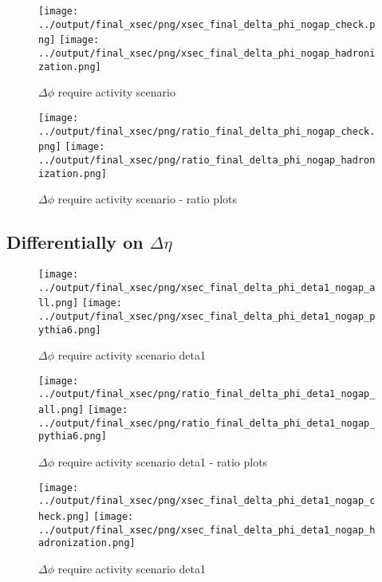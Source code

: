 \documentclass[11pt]{article}
\begin{document}
\begin{figure}[ht]
\centering
\texttt{[image: ../output/final\_xsec/png/xsec\_final\_delta\_phi\_nogap\_check.png]}
\texttt{[image: ../output/final\_xsec/png/xsec\_final\_delta\_phi\_nogap\_hadronization.png]}
\caption{$\Delta\phi$ require activity scenario}
\label{fig:delta_phi_nogapb}
\end{figure}

\begin{figure}[ht]
\centering
\texttt{[image: ../output/final\_xsec/png/ratio\_final\_delta\_phi\_nogap\_check.png]}
\texttt{[image: ../output/final\_xsec/png/ratio\_final\_delta\_phi\_nogap\_hadronization.png]}
\caption{$\Delta\phi$ require activity scenario - ratio plots}
\label{fig:delta_phi_nogapb_ratio}
\end{figure}

\clearpage
\subsection{Differentially on $\Delta\eta$}

\begin{figure}[ht]
\centering
\texttt{[image: ../output/final\_xsec/png/xsec\_final\_delta\_phi\_deta1\_nogap\_all.png]}
\texttt{[image: ../output/final\_xsec/png/xsec\_final\_delta\_phi\_deta1\_nogap\_pythia6.png]}
\caption{$\Delta\phi$ require activity scenario deta1}
\label{fig:delta_phi_deta1_nogap}
\end{figure}

\begin{figure}[ht]
\centering
\texttt{[image: ../output/final\_xsec/png/ratio\_final\_delta\_phi\_deta1\_nogap\_all.png]}
\texttt{[image: ../output/final\_xsec/png/ratio\_final\_delta\_phi\_deta1\_nogap\_pythia6.png]}
\caption{$\Delta\phi$ require activity scenario deta1 - ratio plots}
\label{fig:delta_phi_deta1_nogap_ratio}
\end{figure}

\begin{figure}[ht]
\centering
\texttt{[image: ../output/final\_xsec/png/xsec\_final\_delta\_phi\_deta1\_nogap\_check.png]}
\texttt{[image: ../output/final\_xsec/png/xsec\_final\_delta\_phi\_deta1\_nogap\_hadronization.png]}
\caption{$\Delta\phi$ require activity scenario deta1}
\label{fig:delta_phi_deta1_nogapb}
\end{figure}
\end{document}
